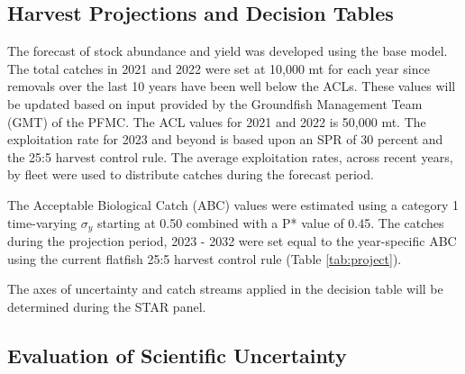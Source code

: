 \documentclass[11pt,
  english,
  a4paper,
]{article}
\begin{document}

\hypertarget{harvest-projections-and-decision-tables}{%
\subsection{Harvest Projections and Decision Tables}\label{harvest-projections-and-decision-tables}}

\leavevmode\tagmcend\tagstructend


The forecast of stock abundance and yield was developed using the base model. The total catches in 2021 and 2022 were set at 10,000 mt for each year since removals over the last 10 years have been well below the ACLs. These values will be updated based on input provided by the Groundfish Management Team (GMT) of the PFMC. The ACL values for 2021 and 2022 is 50,000 mt. The exploitation rate for 2023 and beyond is based upon an SPR of 30 percent and the 25:5 harvest control rule. The average exploitation rates, across recent years, by fleet were used to distribute catches during the forecast period.

\leavevmode\tagmcend\tagstructend\par


The Acceptable Biological Catch (ABC) values were estimated using a category 1 time-varying {\(\sigma_y\)\leavevmode\tagmcend\tagstructend} starting at 0.50 combined with a P* value of 0.45. The catches during the projection period, 2023 - 2032 were set equal to the year-specific ABC using the current flatfish 25:5 harvest control rule (Table \ref{tab:project}).

\leavevmode\tagmcend\tagstructend\par


The axes of uncertainty and catch streams applied in the decision table will be determined during the STAR panel.

\leavevmode\tagmcend\tagstructend\par


\hypertarget{evaluation-of-scientific-uncertainty}{%
\subsection{Evaluation of Scientific Uncertainty}\label{evaluation-of-scientific-uncertainty}}
\end{document}
